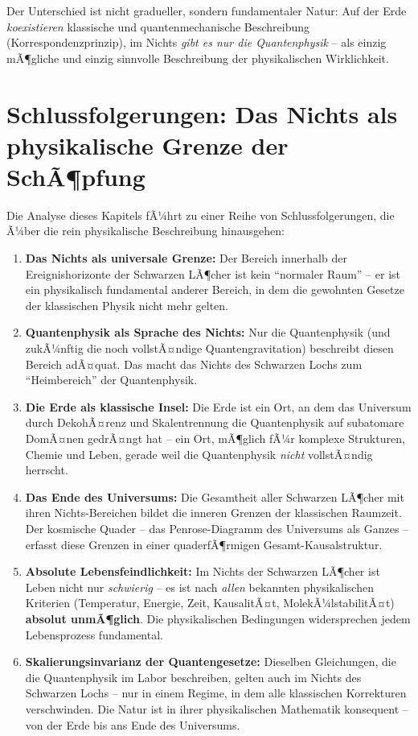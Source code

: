 ﻿\documentclass[12pt,a4paper]{report}
\begin{document}
Der Unterschied ist nicht gradueller, sondern fundamentaler Natur: Auf der Erde \emph{koexistieren} klassische und quantenmechanische Beschreibung (Korrespondenzprinzip), im Nichts \emph{gibt es nur die Quantenphysik} -- als einzig mÃ¶gliche und einzig sinnvolle Beschreibung der physikalischen Wirklichkeit.


\section{Schlussfolgerungen: Das Nichts als physikalische Grenze der SchÃ¶pfung}

Die Analyse dieses Kapitels fÃ¼hrt zu einer Reihe von Schlussfolgerungen, die Ã¼ber die rein physikalische Beschreibung hinausgehen:

\begin{enumerate}
    \item \textbf{Das Nichts als universale Grenze:} Der Bereich
    innerhalb der Ereignishorizonte der Schwarzen LÃ¶cher ist kein ``normaler Raum'' -- er ist ein
    physikalisch fundamental anderer Bereich, in dem die gewohnten Gesetze der klassischen Physik nicht mehr gelten.

    \item \textbf{Quantenphysik als Sprache des Nichts:} Nur die Quantenphysik (und
    zukÃ¼nftig die noch vollstÃ¤ndige Quantengravitation) beschreibt diesen Bereich adÃ¤quat. Das macht das
    Nichts des Schwarzen Lochs zum ``Heimbereich'' der Quantenphysik.

    \item \textbf{Die Erde als klassische Insel:} Die Erde ist ein Ort, an dem das Universum durch DekohÃ¤renz und
    Skalentrennung die Quantenphysik auf subatomare DomÃ¤nen gedrÃ¤ngt hat -- ein Ort, mÃ¶glich
    fÃ¼r komplexe Strukturen, Chemie und Leben, gerade weil die Quantenphysik \emph{nicht} vollstÃ¤ndig herrscht.

    \item \textbf{Das Ende des Universums:} Die Gesamtheit aller Schwarzen LÃ¶cher mit ihren Nichts-Bereichen
    bildet die inneren Grenzen der klassischen Raumzeit. Der kosmische Quader -- das Penrose-Diagramm des Universums als Ganzes --
    erfasst diese Grenzen in einer quaderfÃ¶rmigen Gesamt-Kausalstruktur.

    \item \textbf{Absolute Lebensfeindlichkeit:} Im Nichts der Schwarzen LÃ¶cher ist Leben nicht nur \emph{schwierig} --
    es ist nach \emph{allen} bekannten physikalischen Kriterien (Temperatur, Energie, Zeit, KausalitÃ¤t, MolekÃ¼lstabilitÃ¤t)
    \textbf{absolut unmÃ¶glich}. Die physikalischen Bedingungen widersprechen jedem Lebensprozess fundamental.

    \item \textbf{Skalierungsinvarianz der Quantengesetze:} Dieselben Gleichungen, die die Quantenphysik
    im Labor beschreiben, gelten auch im Nichts des Schwarzen Lochs -- nur in einem Regime, in dem
    alle klassischen Korrekturen verschwinden. Die Natur ist in ihrer physikalischen Mathematik
    konsequent -- von der Erde bis ans Ende des Universums.
\end{enumerate}
\end{document}
